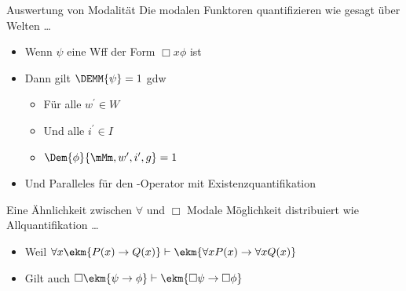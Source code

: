 \begin{frame}
  {Auswertung von Modalität}
  \onslide<+->
  \onslide<+->
  Die modalen Funktoren quantifizieren wie gesagt über Welten \ldots\\
  \Halbzeile
  \onslide<+->
  \begin{itemize}[<+->]
    \item<1-> Wenn \alert{$\psi$} eine Wff der Form \alert{$\Box x\phi$} ist
      \Viertelzeile
    \item Dann gilt \alert{$\DEMM{\psi}=1$} gdw
      \begin{itemize}[<+->]
        \item Für alle \alert{$w^{\prime}\in W$}
        \item Und alle \alert{$i^{\prime}\in I$}
        \item \alert{$\Dem{\phi}{\mMm,w^{\prime},i^{\prime},g}=1$}
      \end{itemize}
      \Viertelzeile
    \item Und Paralleles für den \blau{$\Diamond$}-Operator mit Existenzquantifikation
  \end{itemize}
\end{frame}


\begin{frame}
  {Eine Ähnlichkeit zwischen $\forall$ und $\Box$}
  \onslide<+->
  \onslide<+->
  \alert{Modale Möglichkeit} distribuiert wie Allquantifikation \ldots\\
  \Halbzeile
  \begin{itemize}[<+->]
    \item Weil \alert{$\forall x\ekm{P(x)\rightarrow Q(x)}\vdash\ekm{\forall xP(x) \rightarrow \forall x Q(x)}$}\\
    \item Gilt auch \alert{$\Box\ekm{\psi\rightarrow\phi}\vdash\ekm{\Box \psi\rightarrow\Box\phi}$}\\
  \end{itemize}
\end{frame}

